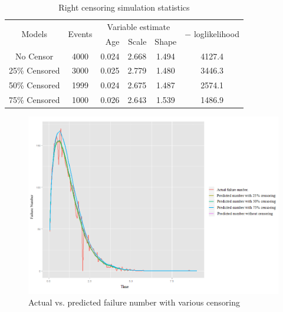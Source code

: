 \documentclass[12pt,letterpaper]{article}
\begin{document}
\begin{table}[htbp]
	\renewcommand{\arraystretch}{1.5}
	\small
	\centering
	\caption{Right censoring simulation statistics}
	\begin{tabular}{ccrrrc}
		\hline
		\multirow{2}[2]{*}{Models} & \multirow{2}[2]{*}{Events} & \multicolumn{3}{c}{Variable estimate} & \multirow{2}[2]{*}{$-$ loglikelihood} \\ \cline{3-5}
		
		&       & Age   & Scale & Shape &  \\\hline
		No Censor & 4000  & \multicolumn{1}{c}{0.024} & \multicolumn{1}{c}{2.668} & \multicolumn{1}{c}{1.494} & 4127.4 \\
		25\% Censored & 3000  & \multicolumn{1}{c}{0.025} & \multicolumn{1}{c}{2.779} & \multicolumn{1}{c}{1.480} & 3446.3 \\
		50\% Censored & 1999  & \multicolumn{1}{c}{0.024} & \multicolumn{1}{c}{2.675} & \multicolumn{1}{c}{1.487} & 2574.1 \\
		75\% Censored & 1000  & \multicolumn{1}{c}{0.026} & \multicolumn{1}{c}{2.643} & \multicolumn{1}{c}{1.539} & 1486.9 \\
		\hline
	\end{tabular}%
	\label{table:rightcensor}%
\end{table}%
\begin{landscape}
	\begin{figure}[htbp]
		\centering
		\includegraphics[width=9in]{Fig7}
		\caption{Actual vs. predicted failure number with various censoring}
		\label{fig:7}
	\end{figure}
\end{landscape}
\end{document}

